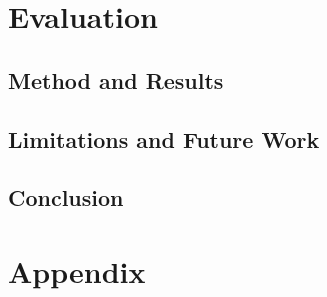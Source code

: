 \documentclass{jdf}
\begin{document}
\section{Evaluation}

\subsection{Method and Results}

\subsection{Limitations and Future Work}

\subsection{Conclusion}

\section{Appendix}



\end{document}
